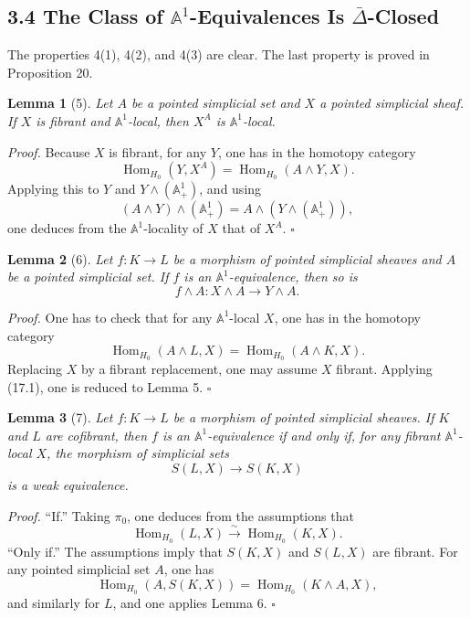 \documentclass[11pt]{article}
\newcommand{\Aone}{\mathbb A^1}
\newcommand{\Hom}{\operatorname{Hom}}
\theoremstyle{deligne}
\newtheorem*{lemma*}{Lemma}
\newenvironment{proofdel}{\noindent\textit{Proof.}}{\hfill$\square$}
\begin{document}
\subsection*{3.4 The Class of \(\Aone\)-Equivalences Is \(\bar\Delta\)-Closed}

The properties 4(1), 4(2), and 4(3) are clear. The last property is proved in Proposition 20.

\begin{lemma*}[5]
Let \(A\) be a pointed simplicial set and \(X\) a pointed simplicial sheaf. If \(X\) is fibrant and \(\Aone\)-local, then \(X^A\) is \(\Aone\)-local.
\end{lemma*}

\begin{proofdel}
Because \(X\) is fibrant, for any \(Y\), one has in the homotopy category
\[
\Hom_{H_0}(Y,X^A)=\Hom_{H_0}(A\wedge Y,X). \tag{17.1}
\]
Applying this to \(Y\) and \(Y\wedge(\Aone_+)\), and using
\[
(A\wedge Y)\wedge(\Aone_+)=A\wedge(Y\wedge(\Aone_+)),
\]
one deduces from the \(\Aone\)-locality of \(X\) that of \(X^A\).
\end{proofdel}

\begin{lemma*}[6]
Let \(f:K\to L\) be a morphism of pointed simplicial sheaves and \(A\) be a pointed simplicial set. If \(f\) is an \(\Aone\)-equivalence, then so is
\[
f\wedge A:X\wedge A\longrightarrow Y\wedge A.
\]
\end{lemma*}

\begin{proofdel}
One has to check that for any \(\Aone\)-local \(X\), one has in the homotopy category
\[
\Hom_{H_0}(A\wedge L,X)=\Hom_{H_0}(A\wedge K,X).
\]
Replacing \(X\) by a fibrant replacement, one may assume \(X\) fibrant. Applying (17.1), one is reduced to Lemma 5.
\end{proofdel}

\begin{lemma*}[7]
Let \(f:K\to L\) be a morphism of pointed simplicial sheaves. If \(K\) and \(L\) are cofibrant, then \(f\) is an \(\Aone\)-equivalence if and only if, for any fibrant \(\Aone\)-local \(X\), the morphism of simplicial sets
\[
S(L,X)\longrightarrow S(K,X)
\]
is a weak equivalence.
\end{lemma*}

\begin{proofdel}
``If.'' Taking \(\pi_0\), one deduces from the assumptions that
\[
\Hom_{H_0}(L,X)\overset{\sim}{\longrightarrow}\Hom_{H_0}(K,X).
\]
``Only if.'' The assumptions imply that \(S(K,X)\) and \(S(L,X)\) are fibrant. For any pointed simplicial set \(A\), one has
\[
\Hom_{H_0}(A,S(K,X))=\Hom_{H_0}(K\wedge A,X),
\]
and similarly for \(L\), and one applies Lemma 6.
\end{proofdel}
\end{document}
